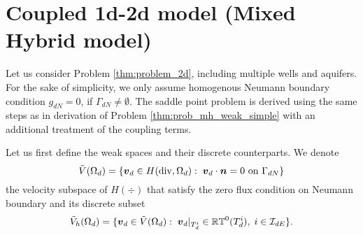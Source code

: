 \section{Coupled 1d-2d model (Mixed Hybrid model)}
\label{sec:coupled_12d}
Let us consider Problem \ref{thm:problem_2d}, including multiple wells and aquifers.
For the sake of simplicity, we only assume homogenous Neumann boundary condition $g_{dN}=0$, if $\Gamma_{dN}\neq\emptyset$.
The saddle point problem is derived using the same steps
as in derivation of Problem \ref{thm:prob_mh_weak_simple} with an additional treatment of the coupling terms.

Let us first define the weak spaces and their discrete counterparts.
We denote
\begin{equation}
    \tilde V(\Omega_d) = \{\mathbf{\boldsymbol{v}}_d \in H({\rm div},\Omega_d):\; \mathbf{\boldsymbol{v}}_d \cdot \mathbf{\boldsymbol{n}} = 0 \textrm{ on } \Gamma_{dN}\}
\end{equation}
the velocity subspace of $H(\div)$ that satisfy the zero flux condition on Neumann boundary
and its discrete subset
\begin{equation}
    \tilde V_h(\Omega_d) = \{\mathbf{\boldsymbol{v}}_d \in \tilde V(\Omega_d):\; \mathbf{\boldsymbol{v}}_d|_{T^i_d} \in\mathbb{RT}^0(T^i_d),\; i\in\mathcal{I}_{dE}\}.
\end{equation}
